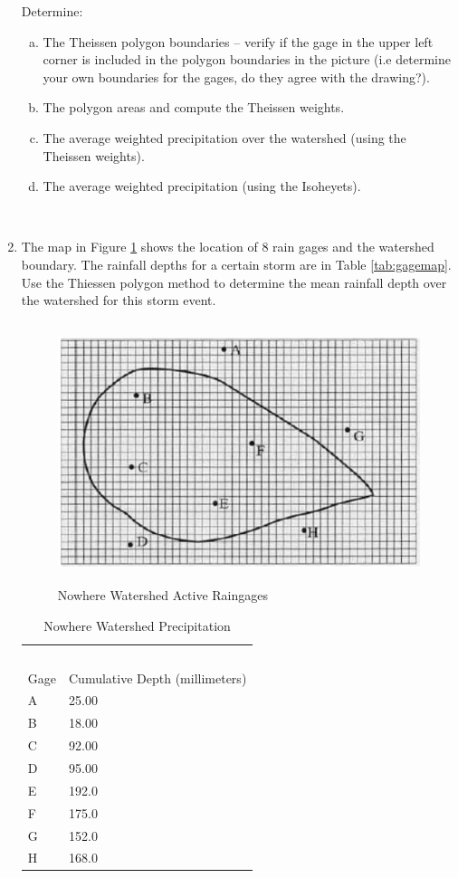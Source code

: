 \documentclass[12pt]{article}
\begin{document}
\begin{enumerate}
Determine:
    \begin{enumerate}[a)]
        \item The Theissen polygon boundaries – verify if the gage in the upper left corner is included in the polygon boundaries in the picture (i.e determine your own boundaries for the gages, do they agree with the drawing?). 
        \item The polygon areas and compute the Theissen weights.
        \item The average weighted precipitation over the watershed (using the Theissen weights).
        \item The average weighted precipitation (using the Isoheyets).
    \end{enumerate}
\clearpage
~\newline
\clearpage
\item The map in Figure \ref{fig:gagemap} shows the location of 8 rain gages and the watershed boundary. The rainfall depths for a certain storm are in Table \ref{tab:gagemap}. Use the Thiessen polygon method to determine the mean rainfall depth over the watershed for this storm event.

\begin{figure}[h!] %
   \centering
   \includegraphics[height=3in]{gagemap.png} 
   \caption{Nowhere Watershed Active Raingages}
   \label{fig:gagemap}
\end{figure}

\begin{table}[h!]
\centering
\caption{Nowhere Watershed Precipitation}
\begin{tabular}{p{2.0in}p{2.0in}} %
~&~\\
Gage & Cumulative Depth (millimeters)\\
\hline
\hline
A & 25.00 \\
B & 18.00 \\
C & 92.00 \\
D & 95.00 \\
E & 192.0 \\
F & 175.0 \\
G & 152.0 \\
H & 168.0 \\


\end{tabular}
\end{table}
\end{enumerate}
\end{document}
